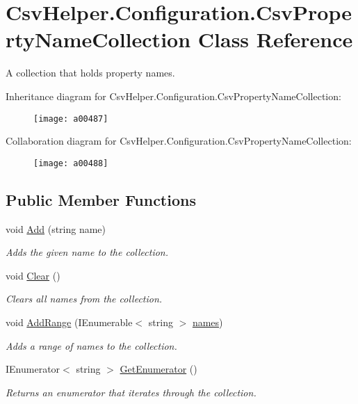 \hypertarget{a00068}{\section{Csv\-Helper.\-Configuration.\-Csv\-Property\-Name\-Collection Class Reference}
\label{a00068}
}


A collection that holds property names.  




Inheritance diagram for Csv\-Helper.\-Configuration.\-Csv\-Property\-Name\-Collection\-:
\nopagebreak
\begin{figure}[H]
\begin{center}
\leavevmode
\texttt{[image: a00487]}
\end{center}
\end{figure}


Collaboration diagram for Csv\-Helper.\-Configuration.\-Csv\-Property\-Name\-Collection\-:
\nopagebreak
\begin{figure}[H]
\begin{center}
\leavevmode
\texttt{[image: a00488]}
\end{center}
\end{figure}
\subsection*{Public Member Functions}
\begin{DoxyCompactItemize}
\item 
void \hyperlink{a00068_ad7b7d11d5814bcce5ed38e054ef71b4e}{Add} (string name)
\begin{DoxyCompactList}\small\item\em Adds the given name to the collection. \end{DoxyCompactList}\item 
void \hyperlink{a00068_abec990435c8dccfb4553602b89f93201}{Clear} ()
\begin{DoxyCompactList}\small\item\em Clears all names from the collection. \end{DoxyCompactList}\item 
void \hyperlink{a00068_ac568746273968080890abca50b882802}{Add\-Range} (I\-Enumerable$<$ string $>$ \hyperlink{a00068_a41eb6804d8afe8d674e64d71f66962ce}{names})
\begin{DoxyCompactList}\small\item\em Adds a range of names to the collection. \end{DoxyCompactList}\item 
I\-Enumerator$<$ string $>$ \hyperlink{a00068_a61b6a80e51d06f17d0043ec6aef89f1b}{Get\-Enumerator} ()
\begin{DoxyCompactList}\small\item\em Returns an enumerator that iterates through the collection. \end{DoxyCompactList}\end{DoxyCompactItemize}
